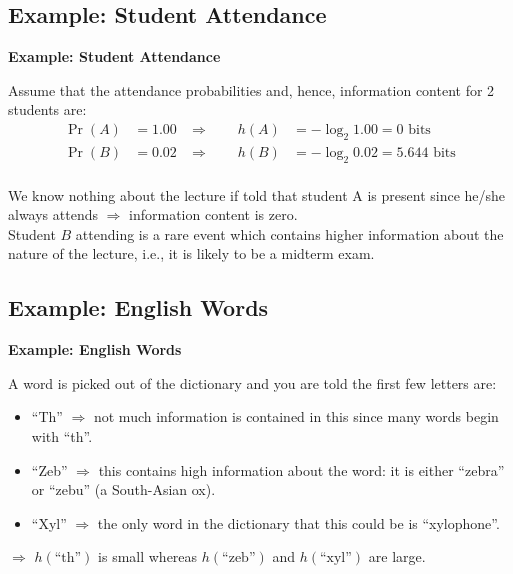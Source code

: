 \documentclass[compress]{beamer}        %
\makeatletter
\newcommand{\tcb}{\textcolor{beamer@blendedblue}}
\makeatother
\begin{document}
\subsection{Example: Student Attendance}
\begin{frame}{\bf \tcb{Example: Student Attendance}}

Assume that the attendance probabilities and, hence, information content for 2 students are:
\begin{align*}
\Pr(A) &= 1.00 & \Rightarrow \qquad h(A) &= - \log_2 1.00 = 0 \text{ bits}\\[0.6cm]
\Pr(B) &= 0.02 & \Rightarrow \qquad h(B) &= - \log_2 0.02 =  5.644 \text{ bits} \\[-0.2cm]
\end{align*}

We know nothing about the lecture if told that student A is present since he/she always attends $\Rightarrow$ information content is zero.\\[0.6cm]

Student $B$ attending is a rare event which contains higher information about the nature of the lecture, i.e., it is likely to be a midterm exam.

\end{frame}




\subsection{Example: English Words}
\begin{frame}{\bf \tcb{Example: English Words}}

A word is picked out of the dictionary and you are told the first few letters are:\\[0.3cm]
\begin{itemize}\itemsep0.8cm
\item ``Th'' $\Rightarrow$ not much information is contained in this since many words begin with ``th''.
\item ``Zeb'' $\Rightarrow$ this contains high information about the word: it is either ``zebra'' or ``zebu'' (a South-Asian ox).
\item ``Xyl'' $\Rightarrow$ the only word in the dictionary that this could be is ``xylophone''.\\[0.6cm]
\end{itemize}

$\Rightarrow$ $h(\text{``th''})$ is small whereas $h(\text{``zeb''})$ and $h(\text{``xyl''})$ are large.

\end{frame}
\end{document}
